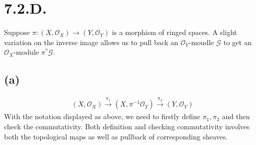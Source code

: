 \section{7.2.D.}

\begin{exercise}
    Suppose $\pi:(X,\mathscr O_X)\to (Y,\mathscr O_Y)$ is a morphism of ringed spaces. A slight variation on the inverse image allows us to pull back an $\mathscr O_Y$-moudle $\mathscr G$ to get an $\mathscr O_X$-module $\pi^{\ast}\mathscr G$.
    
\end{exercise}
\subsection{(a)}
\begin{align}
    (X,\mathscr O_X)\overset{\pi_1}{\to}(X,\pi^{-1}\mathscr O_Y)\overset{\pi_2}{\to} (Y,\mathscr O_Y)
\end{align}
With the notation displayed as above, we need to firstly define $\pi_1,\pi_2$ and then check the commutativity. Both definition and checking commutativity involves both the topological maps as well as pullback of corresponding sheaves.

